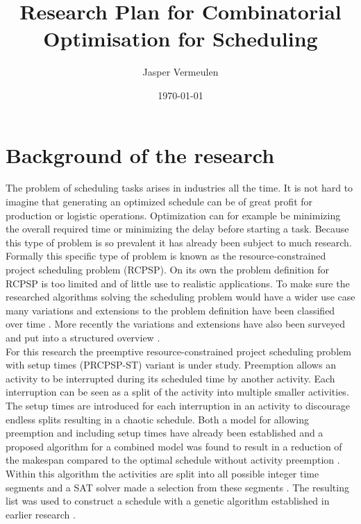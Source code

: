 \documentclass[english]{article}
\title{Research Plan for Combinatorial Optimisation for Scheduling}
\author{Jasper Vermeulen}
\date{\today}
\begin{document}
\maketitle

\section*{Background of the research}
The problem of scheduling tasks arises in industries all the time. It is not hard to imagine that generating an optimized schedule can be of great profit for production or logistic operations. Optimization can for example be minimizing the overall required time or minimizing the delay before starting a task. Because this type of problem is so prevalent it has already been subject to much research.\\
Formally this specific type of problem is known as the resource-constrained project scheduling problem (RCPSP). On its own the problem definition for RCPSP is too limited and of little use to realistic applications. To make sure the researched algorithms solving the scheduling problem would have a wider use case many variations and extensions to the problem definition have been classified over time \cite{RN9} \cite{RN10}. More recently the variations and extensions have also been surveyed and put into a structured overview \cite{RN6}.\\
For this research the preemptive resource-constrained project scheduling problem with setup times (PRCPSP-ST) variant is under study. Preemption allows an activity to be interrupted during its scheduled time by another activity. Each interruption can be seen as a split of the activity into multiple smaller activities. The setup times are introduced for each interruption in an activity to discourage endless splits resulting in a chaotic schedule. Both a model for allowing preemption \cite{RN21} and including setup times \cite{RN13} have already been established and a proposed algorithm for a combined model was found to result in a reduction of the makespan compared to the optimal schedule without activity preemption \cite{RN1}. Within this algorithm the activities are split into all possible integer time segments and a SAT solver made a selection from these segments \cite{RN3}. The resulting list was used to construct a schedule with a genetic algorithm established in earlier research \cite{RN14}.\\
\end{document}
